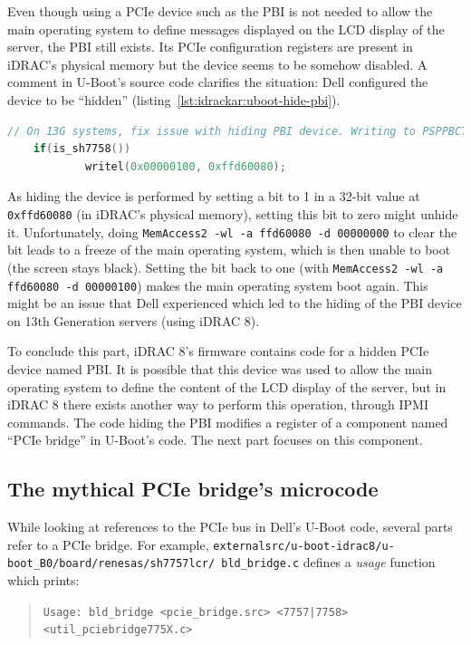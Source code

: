 Even though using a PCIe device such as the PBI is not needed to allow the main operating system to define messages displayed on the LCD display of the server, the PBI still exists.
Its PCIe configuration registers are present in iDRAC's physical memory but the device seems to be somehow disabled.
A comment in U-Boot's source code clarifies the situation: Dell configured the device to be ``hidden'' (listing~\ref{lst:idrackar:uboot-hide-pbi}).

{\captionsetup{margin=4.5pt,font=footnotesize,labelfont=bf,labelsep=period}
\begin{lstlisting}[language={C},caption={Extract from U-Boot's \texttt{init\_pcie\_bridge} function, in \texttt{externalsrc/u-boot-idrac8/u-boot\_B0/board/renesas/sh7757lcr/sh7757lcr.c}.},label={lst:idrackar:uboot-hide-pbi}]
    // On 13G systems, fix issue with hiding PBI device. Writing to PSPPBCTL DRS[1:0] = '01b'
    if(is_sh7758())
            writel(0x00000100, 0xffd60080);
\end{lstlisting}}

As hiding the device is performed by setting a bit to 1 in a 32-bit value at \texttt{0xffd60080} (in iDRAC's physical memory), setting this bit to zero might unhide it.
Unfortunately, doing \texttt{MemAccess2 -wl -a ffd60080 -d 00000000} to clear the bit leads to a freeze of the main operating system, which is then unable to boot (the screen stays black).
Setting the bit back to one (with \texttt{MemAccess2 -wl -a ffd60080 -d 00000100}) makes the main operating system boot again.
This might be an issue that Dell experienced which led to the hiding of the PBI device on 13th Generation servers (using iDRAC 8).

To conclude this part, iDRAC 8's firmware contains code for a hidden PCIe device named PBI.
It is possible that this device was used to allow the main operating system to define the content of the LCD display of the server, but in iDRAC 8 there exists another way to perform this operation, through IPMI commands.
The code hiding the PBI modifies a register of a component named ``PCIe bridge'' in U-Boot's code.
The next part focuses on this component.

\subsection{The mythical PCIe bridge's microcode}

While looking at references to the PCIe bus in Dell's U-Boot code, several parts refer to a PCIe bridge.
For example, \texttt{externalsrc/u-boot-idrac8/u-boot\_B0/board/renesas/sh7757lcr/ bld\_bridge.c} defines a \emph{usage} function which prints:
\begin{quote}
  {\footnotesize
  \texttt{Usage: bld\_bridge <pcie\_bridge.src> <7757|7758> <util\_pciebridge775X.c>}}
\end{quote}

